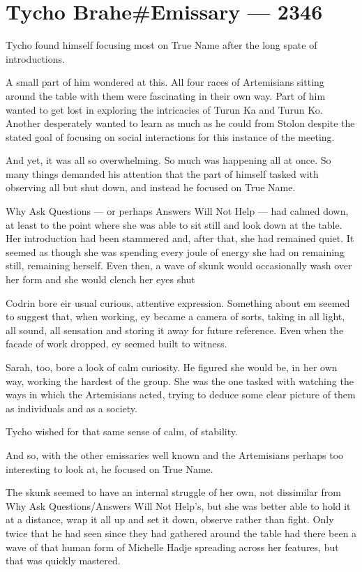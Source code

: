 \hypertarget{tycho-braheemissary-2346}{%
\chapter{Tycho Brahe\#Emissary — 2346}\label{tycho-braheemissary-2346}}

Tycho found himself focusing most on True Name after the long spate of introductions.

A small part of him wondered at this. All four races of Artemisians sitting around the table with them were fascinating in their own way. Part of him wanted to get lost in exploring the intricacies of Turun Ka and Turun Ko. Another desperately wanted to learn as much as he could from Stolon despite the stated goal of focusing on social interactions for this instance of the meeting.

And yet, it was all so overwhelming. So much was happening all at once. So many things demanded his attention that the part of himself tasked with observing all but shut down, and instead he focused on True Name.

Why Ask Questions — or perhaps Answers Will Not Help — had calmed down, at least to the point where she was able to sit still and look down at the table. Her introduction had been stammered and, after that, she had remained quiet. It seemed as though she was spending every joule of energy she had on remaining still, remaining herself. Even then, a wave of skunk would occasionally wash over her form and she would clench her eyes shut

Codrin bore eir usual curious, attentive expression. Something about em seemed to suggest that, when working, ey became a camera of sorts, taking in all light, all sound, all sensation and storing it away for future reference. Even when the facade of work dropped, ey seemed built to witness.

Sarah, too, bore a look of calm curiosity. He figured she would be, in her own way, working the hardest of the group. She was the one tasked with watching the ways in which the Artemisians acted, trying to deduce some clear picture of them as individuals and as a society.

Tycho wished for that same sense of calm, of stability.

And so, with the other emissaries well known and the Artemisians perhaps too interesting to look at, he focused on True Name.

The skunk seemed to have an internal struggle of her own, not dissimilar from Why Ask Questions/Answers Will Not Help's, but she was better able to hold it at a distance, wrap it all up and set it down, observe rather than fight. Only twice that he had seen since they had gathered around the table had there been a wave of that human form of Michelle Hadje spreading across her features, but that was quickly mastered.


